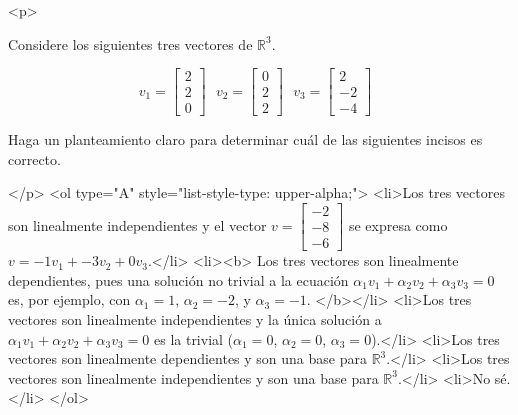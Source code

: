 
<p>

    Considere los siguientes tres vectores de $\mathbb{R}^3$.

    $$
    v_1=\begin{bmatrix} 2 \\ 2 \\ 0 \end{bmatrix} \ \ \ 
    v_2=\begin{bmatrix} 0 \\ 2 \\ 2 \end{bmatrix} \ \ \ 
    v_3=\begin{bmatrix} 2 \\ -2 \\ -4 \end{bmatrix} \ \ \ 
    $$

    Haga un planteamiento claro para determinar cuál de las siguientes incisos es correcto.
    
</p>
<ol type="A" style="list-style-type: upper-alpha;">
    <li>Los tres vectores son linealmente independientes y el vector $v=\begin{bmatrix} -2 \\ -8 \\ -6 \end{bmatrix}$ se expresa como $v=-1v_1+-3v_2+0v_3$.</li>
<li><b>
    Los tres vectores son linealmente dependientes, pues una solución no trivial a la ecuación $\alpha_1v_1+\alpha_2v_2+\alpha_3v_3=0$ es, por ejemplo, con $\alpha_1=1$, $\alpha_2=-2$, y $\alpha_3=-1$.
    </b></li>
<li>Los tres vectores son linealmente independientes y la única solución a $\alpha_1v_1+\alpha_2v_2+\alpha_3v_3=0$ es la trivial ($\alpha_1=0$, $\alpha_2=0$, $\alpha_3=0$).</li>
<li>Los tres vectores son linealmente dependientes y son una base para $\mathbb{R}^3$.</li>
<li>Los tres vectores son linealmente independientes y son una base para $\mathbb{R}^3$.</li>
<li>No sé.</li>
</ol>
